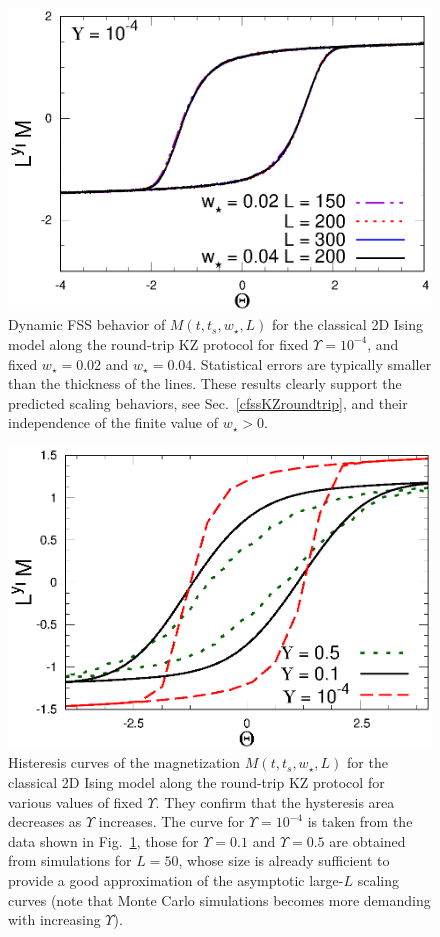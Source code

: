 \begin{figure}[!htb]
\centering
    \includegraphics[width=0.65\columnwidth]{imm/isC2Dw002Y104.eps}
  \caption{ Dynamic FSS behavior of $M(t,t_s,w_\star,L)$ for the
    classical 2D Ising model along the round-trip KZ protocol for
    fixed $\Upsilon=10^{-4}$, and fixed $w_\star = 0.02$ and $w_\star
    = 0.04$. Statistical errors are typically smaller than the
    thickness of the lines. These results clearly support the
    predicted scaling behaviors, see Sec.~\ref{cfssKZroundtrip}, and
    their independence of the finite value of $w_\star>0$.  }
  \label{roundtripMW}
\end{figure}


\begin{figure}[!htb]
\centering
    \includegraphics[width=0.65\columnwidth]{imm/isC2DL50.eps}
    \caption{Histeresis curves of the magnetization
      $M(t,t_s,w_\star,L)$ for the classical 2D Ising model along the
      round-trip KZ protocol for various values of fixed $\Upsilon$.
      They confirm that the hysteresis area decreases as $\Upsilon$
      increases. The curve for $\Upsilon=10^{-4}$ is taken from the
      data shown in Fig.~\ref{roundtripMW}, those for $\Upsilon=0.1$
      and $\Upsilon=0.5$ are obtained from simulations for $L=50$,
      whose size is already sufficient to provide a good approximation
      of the asymptotic large-$L$ scaling curves (note that Monte
      Carlo simulations becomes more demanding with increasing
      $\Upsilon$).}
  \label{roundtripMW2}
\end{figure}



